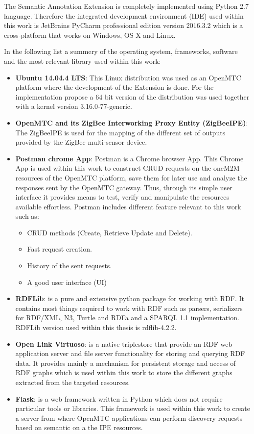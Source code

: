 The Semantic Annotation Extension is completely implemented using Python 2.7 language. Therefore the integrated development environment (IDE) used within this work is JetBrains PyCharm professional edition version 2016.3.2 which is a cross-platform that works on Windows, OS X and Linux.\par 
In the following list a summery of the operating system, frameworks, software and the most relevant library used within this work:
\begin{itemize}
\item \textbf{Ubuntu 14.04.4 LTS}: This Linux distribution was used as an OpenMTC platform where the development of the Extension is done. For the implementation propose a 64 bit version of the distribution was used together with a kernel version 3.16.0-77-generic.

\item \textbf{OpenMTC and its ZigBee Interworking Proxy Entity (ZigBeeIPE)}: The ZigBeeIPE is used for the mapping of the different set of outputs provided by the ZigBee multi-sensor device. 
\item \textbf{Postman chrome App}: Postman is a Chrome browser App. This Chrome App is used within this work to construct CRUD requests on the oneM2M resources of the OpenMTC platform, save them for later use and analyze the responses sent by the OpenMTC gateway. Thus, through its simple user interface it provides means to test, verify and manipulate the resources available effortless. Postman includes different feature relevant to this work such as: 
\begin{itemize}
\item CRUD methods (Create, Retrieve Update and Delete).
\item Fast request creation.
\item History of the sent requests.
\item A good user interface (UI)
\end{itemize}
\item \textbf{RDFLib}: is a pure and extensive python package for working with RDF. It contains most things required to work with RDF such as parsers, serializers for RDF/XML, N3, Turtle and RDFa and a SPARQL 1.1 implementation. RDFLib version used within this thesis is rdflib-4.2.2.
\item \textbf{Open Link Virtuoso}: is a native triplestore that provide an RDF web application server and file server functionality for storing and querying RDF data. It provides mainly a mechanism for persistent storage and access of RDF graphs which is used within this work to store the different graphs extracted from the targeted resources.

\item \textbf{Flask}: is a web framework written in Python which does not require particular tools or libraries. This framework is used within this work to create a server from where OpenMTC applications can perform discovery requests based on semantic on a the IPE resources.
\end{itemize}
